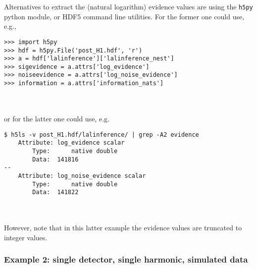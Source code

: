 Alternatives to extract the (natural logarithm) evidence values are using the {\tt h5py} python module, or HDF5 command line utilities. For the former one could
use, e.g.,
\begin{lrbox}{\Lst}
\begin{lstlisting}
>>> import h5py
>>> hdf = h5py.File('post_H1.hdf', 'r')
>>> a = hdf['lalinference']['lalinference_nest']
>>> sigevidence = a.attrs['log_evidence']
>>> noiseevidence = a.attrs['log_noise_evidence']
>>> information = a.attrs['information_nats']
\end{lstlisting}
\end{lrbox}
\\[5pt] \indent \fbox{\usebox{\Lst}} \\[5pt]
or for the latter one could use, e.g.\
\begin{lrbox}{\Lst}
\begin{lstlisting}
$ h5ls -v post_H1.hdf/lalinference/ | grep -A2 evidence
    Attribute: log_evidence scalar
        Type:      native double
        Data:  141816
--
    Attribute: log_noise_evidence scalar
        Type:      native double
        Data:  141822
\end{lstlisting}
\end{lrbox}
\\[5pt] \indent \fbox{\usebox{\Lst}} \\[5pt]
However, note that in this latter example the evidence values are truncated to integer values.

\subsubsection{Example 2: single detector, single harmonic, simulated data}\label{sec:example2}

